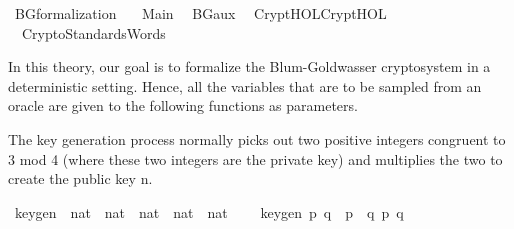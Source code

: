 %
\begin{isabellebody}%
%
%
\isadelimtheory
%
\endisadelimtheory
%
\isatagtheory
{}\isamarkupfalse%
\ BG{\isacharunderscore}{\kern0pt}formalization\ \isanewline
\ \ Main\isanewline
\ \ BG{\isacharunderscore}{\kern0pt}aux\isanewline
\ \ {\isachardoublequoteopen}CryptHOL{\isachardot}{\kern0pt}CryptHOL{\isachardoublequoteclose}\isanewline
\ \ {\isachardoublequoteopen}Crypto{\isacharunderscore}{\kern0pt}Standards{\isachardot}{\kern0pt}Words{\isachardoublequoteclose}\isanewline
{}%
\endisatagtheory
{\isafoldtheory}%
%
\isadelimtheory
%
\endisadelimtheory
%
\isadelimdocument
%
\endisadelimdocument
%
\isatagdocument
%
\isamarkuptrue%
%
\endisatagdocument
{\isafolddocument}%
%
\isadelimdocument
%
\endisadelimdocument
%
\begin{isamarkuptext}%
In this theory, our goal is to formalize the Blum-Goldwasser cryptosystem in a deterministic 
setting. Hence, all the variables that are to be sampled from an oracle are given to the following
functions as parameters.%
\end{isamarkuptext}\isamarkuptrue%
%
\isadelimdocument
%
\endisadelimdocument
%
\isatagdocument
%
\isamarkuptrue%
%
\endisatagdocument
{\isafolddocument}%
%
\isadelimdocument
%
\endisadelimdocument
%
\begin{isamarkuptext}%
The key generation process normally picks out two positive integers congruent to 3 mod 4 
(where these two integers are the private key) and multiplies the two to create the public key n.%
\end{isamarkuptext}\isamarkuptrue%
\isamarkupfalse%
\ key{\isacharunderscore}{\kern0pt}gen\ {\isacharcolon}{\kern0pt}{\isacharcolon}{\kern0pt}\ {\isachardoublequoteopen}nat\ {\isasymRightarrow}\ nat\ {\isasymRightarrow}\ {\isacharparenleft}{\kern0pt}nat\ {\isasymtimes}\ {\isacharparenleft}{\kern0pt}nat\ {\isasymtimes}\ nat{\isacharparenright}{\kern0pt}{\isacharparenright}{\kern0pt}{\isachardoublequoteclose}\ \ \isanewline
\ \ {\isachardoublequoteopen}key{\isacharunderscore}{\kern0pt}gen\ p\ q\ {\isacharequal}{\kern0pt}\ {\isacharparenleft}{\kern0pt}p\ {\isacharasterisk}{\kern0pt}\ q{\isacharcomma}{\kern0pt}\ {\isacharparenleft}{\kern0pt}p{\isacharcomma}{\kern0pt}\ q{\isacharparenright}{\kern0pt}{\isacharparenright}{\kern0pt}{\isachardoublequoteclose}%
\isadelimdocument
%
\endisadelimdocument

\end{isabellebody}
